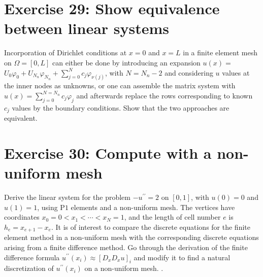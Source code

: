 \documentclass[../main.tex]{subfiles}
\begin{document}
	\section*{Exercise 29: Show equivalence between linear systems}
		\noindent Incorporation of Dirichlet conditions at $x=0$ and $x=L$ in a finite element mesh on $\Omega=[0, L]$ can either be done by introducing an expansion $u(x)=$ $U_{0} \varphi_{0}+U_{N_{n}} \varphi_{N_{n}}+\sum_{j=0}^{N} c_{j} \varphi_{\nu(j)}$, with $N=N_{n}-2$ and considering $u$ values at the inner nodes as unknowns, or one can assemble the matrix system with $u(x)=\sum_{j=0}^{N=N_{n}} c_{j} \varphi_{j}$ and afterwards replace the rows corresponding to known $c_{j}$ values by the boundary conditions. Show that the two approaches are equivalent.\bigbreak
	\section*{Exercise 30: Compute with a non-uniform mesh}
		\noindent Derive the linear system for the problem $-u^{\prime \prime}=2$ on $[0,1]$, with $u(0)=0$ and $u(1)=1$, using $\mathrm{P} 1$ elements and a non-uniform mesh. The vertices have coordinates $x_{0}=0<x_{1}<\cdots<x_{N}=1$, and the length of cell number $e$ is $h_{e}=x_{e+1}-x_{e}$.\smallbreak
		It is of interest to compare the discrete equations for the finite element method in a non-uniform mesh with the corresponding discrete equations arising from a finite difference method. Go through the derivation of the finite difference formula $u^{\prime \prime}\left(x_{i}\right) \approx\left[D_{x} D_{x} u\right]_{i}$ and modify it to find a natural discretization of $u^{\prime \prime}\left(x_{i}\right)$ on a non-uniform mesh. .\bigbreak		
\end{document}
